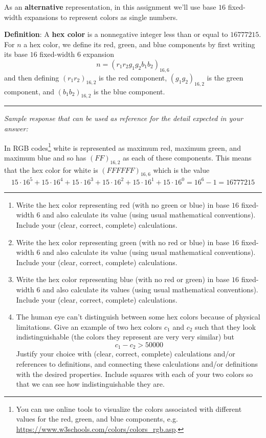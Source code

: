 \documentclass[12pt, oneside]{article}
\begin{document}
\begin{enumerate}
    As an {\bf alternative} representation, in this assignment
    we'll use base $16$ fixed-width expansions to represent colors
    as single numbers.
    
    {\bf Definition}: A {\bf hex color} is a nonnegative
    integer less than or equal to $16777215$. 
    For $n$ a hex color, we define its red, green, and blue components
    by first writing its base $16$ fixed-width $6$ expansion
    $$n = (r_1r_2g_1g_2b_1b_2)_{16,6}$$ and 
    then defining
    $(r_1r_2)_{16,2}$ is the red
    component, $(g_1g_2)_{16,2}$ is the green component, and $(b_1b_2)_{16,2}$ is the
    blue component.
    
    \newpage
    \rule{0.5\textwidth}{.4pt}

    {\it Sample response that can be used as reference for the detail expected 
    in your answer:} 
    
    In RGB codes\footnote{You can use online tools to visualize the colors associated
    with different values for the red, green, and blue components, 
    e.g. \url{https://www.w3schools.com/colors/colors_rgb.asp}. }
    white is represented as maximum red, maximum green, and maximum blue 
    and so has
    $(FF)_{16,2}$ as each of these components. This means that the hex color for white
    is $(FFFFFF)_{16,6}$ which is the value 
    \[
        15\cdot 16^5 + 15 \cdot 16^4 + 15 \cdot 16^3 + 15 \cdot 16^2 + 15 \cdot 16^1 + 15 \cdot 16^0 
        = 16^6 - 1 = 16777215
    \]
    \rule{0.5\textwidth}{.4pt}

    \begin{enumerate}
    \item  Write the hex color representing red (with no green or blue) 
    in base $16$ fixed-width $6$ and also calculate its value 
    (using usual mathematical conventions).
    Include your (clear, correct, complete) calculations.
    \item  Write the hex color representing green (with no red or blue) 
    in base $16$ fixed-width $6$ and also calculate its value
    (using usual mathematical conventions).
    Include your (clear, correct, complete) calculations.
    \item  Write the hex color representing blue (with no red or green) 
    in base $16$ fixed-width $6$ and also calculate its values
    (using usual mathematical conventions).
    Include your (clear, correct, complete) calculations.
    \item The human eye can't distinguish between some hex colors because of 
    physical limitations. Give an example of two hex colors $c_1$ and $c_2$ such that
    they look indistinguishable (the colors they represent are very very similar) but
        \[
            c_1 - c_2 > 50000
        \]
    Justify your choice 
    with (clear, correct, complete) calculations and/or references to definitions, 
    and connecting these
    calculations and/or definitions with
    the desired properties.  Include squares with each of your two colors so 
    that we can see how indistinguishable they are. 


\end{enumerate}
\end{enumerate}
\end{document}
